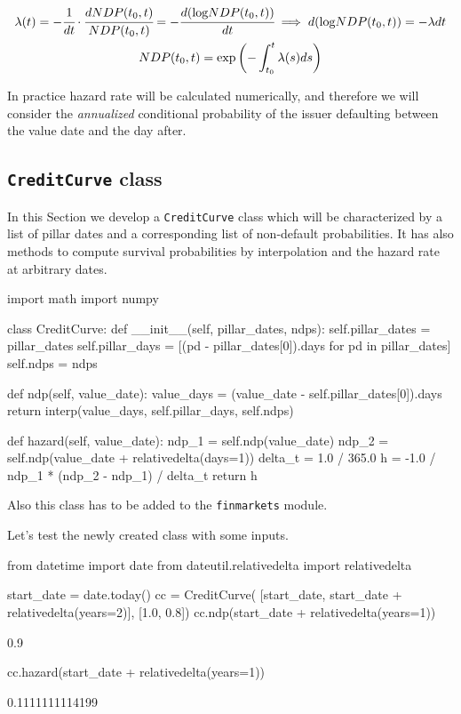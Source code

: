 \begin{equation}
\begin{gathered}
\lambda(t) = -\cfrac{1}{dt}\cdot\cfrac{dNDP(t_0, t)}{NDP(t_0, t)} = -\cfrac{d(\textrm{log}NDP(t_0, t))}{dt} \implies d(\textrm{log}NDP(t_0, t)) = -\lambda dt\\
NDP(t_0, t) = \mathrm{exp}\left(-\int_{t_0}^{t}\lambda(s) ds\right)
\end{gathered}
\end{equation}

In practice hazard rate will be calculated numerically, and therefore we will consider the \emph{annualized} conditional probability of the issuer defaulting between the value date and the day after.

\subsection{\texttt{CreditCurve} class}

In this Section we develop a \texttt{CreditCurve} class which will be characterized by a list of pillar dates and a corresponding list of non-default probabilities. It has also methods to compute survival probabilities by interpolation and the hazard rate at arbitrary dates.
  
\begin{ipython}
import math
import numpy

class CreditCurve:
    def __init__(self, pillar_dates, ndps):
        self.pillar_dates = pillar_dates
        self.pillar_days = [(pd - pillar_dates[0]).days for pd in pillar_dates]
        self.ndps = ndps

    def ndp(self, value_date):
        value_days = (value_date - self.pillar_dates[0]).days
        return interp(value_days, self.pillar_days, self.ndps)

    def hazard(self, value_date):
        ndp_1 = self.ndp(value_date)
        ndp_2 = self.ndp(value_date + relativedelta(days=1))
        delta_t = 1.0 / 365.0
        h = -1.0 / ndp_1 * (ndp_2 - ndp_1) / delta_t
        return h
\end{ipython}

\begin{finmarkets}
Also this class has to be added to the \texttt{finmarkets} module.
\end{finmarkets}

Let's test the newly created class with some inputs.
\begin{ipython}
from datetime import date
from dateutil.relativedelta import relativedelta

start_date = date.today()
cc = CreditCurve(
    [start_date, start_date + relativedelta(years=2)],
    [1.0, 0.8])
cc.ndp(start_date + relativedelta(years=1))
\end{ipython}
\begin{ioutput}
0.9
\end{ioutput}
\begin{ipython}
cc.hazard(start_date + relativedelta(years=1))
\end{ipython}
\begin{ioutput}
0.1111111114199
\end{ioutput}
            
